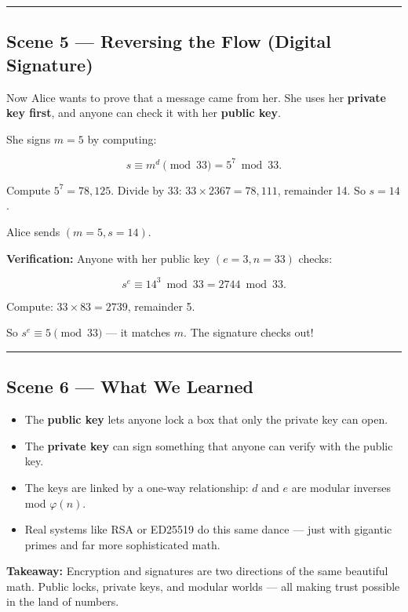 \documentclass[12pt]{article}
\begin{document}
\bigskip
\hrule
\vspace{0.5em}

\subsection*{Scene 5 — Reversing the Flow (Digital Signature)}

Now Alice wants to prove that a message came from her.  
She uses her \textbf{private key first}, and anyone can check it with her \textbf{public key}.

She signs $m=5$ by computing:

\[
s \equiv m^d \pmod{33} = 5^7 \bmod 33.
\]

Compute $5^7 = 78{,}125$.  
Divide by 33: $33\times2367 = 78{,}111$, remainder 14.  
So $s=14$.

Alice sends $(m=5, s=14)$.

\textbf{Verification:}  
Anyone with her public key $(e=3,n=33)$ checks:

\[
s^e \equiv 14^3 \bmod 33 = 2744 \bmod 33.
\]

Compute: $33\times83=2739$, remainder 5.

So $s^e \equiv 5 \pmod{33}$ — it matches $m$.  
The signature checks out!

\bigskip
\hrule
\vspace{0.5em}

\subsection*{Scene 6 — What We Learned}

\begin{itemize}
  \item The \textbf{public key} lets anyone lock a box that only the private key can open.
  \item The \textbf{private key} can sign something that anyone can verify with the public key.
  \item The keys are linked by a one-way relationship: $d$ and $e$ are modular inverses mod $\varphi(n)$.
  \item Real systems like RSA or ED25519 do this same dance — just with gigantic primes and far more sophisticated math.
\end{itemize}

\bigskip
\textbf{Takeaway:}  
Encryption and signatures are two directions of the same beautiful math.  
Public locks, private keys, and modular worlds —  
all making trust possible in the land of numbers.
\end{document}
